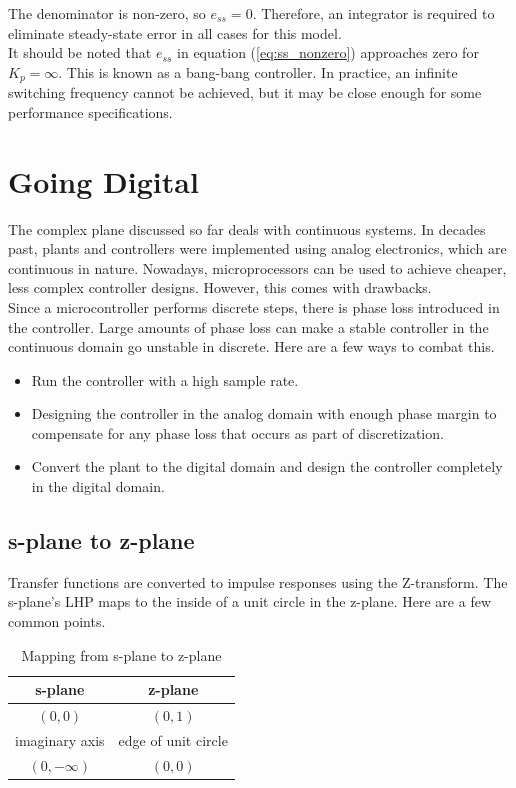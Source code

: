 \documentclass[10pt,conference,compsoc]{IEEEtran}
\begin{document}
\noindent The denominator is non-zero, so $e_{ss} = 0$. Therefore, an integrator
is required to eliminate \gls{steady-state error} in all cases for this model.
\\

\noindent It should be noted that $e_{ss}$ in equation (\ref{eq:ss_nonzero})
approaches zero for $K_p = \infty$. This is known as a bang-bang controller. In
practice, an infinite switching frequency cannot be achieved, but it may be
close enough for some performance specifications.

\section{Going Digital}

\noindent The complex plane discussed so far deals with continuous
\glspl{system}. In decades past, \glspl{plant} and controllers were implemented
using analog electronics, which are continuous in nature. Nowadays,
microprocessors can be used to achieve cheaper, less complex controller designs.
However, this comes with drawbacks. \\

\noindent Since a microcontroller performs discrete steps, there is phase loss
introduced in the controller. Large amounts of phase loss can make a stable
controller in the continuous domain go unstable in discrete. Here are a few ways
to combat this.

\begin{itemize}
  \item Run the controller with a high sample rate.
  \item Designing the controller in the analog domain with enough phase margin
    to compensate for any phase loss that occurs as part of discretization.
  \item Convert the \gls{plant} to the digital domain and design the controller
    completely in the digital domain.
\end{itemize}

\subsection{s-plane to z-plane}

\noindent Transfer functions are converted to impulse responses using the
Z-transform. The s-plane's LHP maps to the inside of a unit circle in the
z-plane. Here are a few common points.

\begin{table}[ht]
  \caption{Mapping from s-plane to z-plane}
  \renewcommand{\arraystretch}{1.3}
  \centering
  \begin{tabular}{|cc|}
    \hline
    \textbf{s-plane} & \textbf{z-plane} \\
    \hline
    $(0, 0)$ & $(0, 1)$ \\
    imaginary axis & edge of unit circle \\
    $(0, -\infty)$ & $(0, 0)$ \\
    \hline
  \end{tabular}
  \label{tab:s-plane2z-plane}
\end{table}
\end{document}
